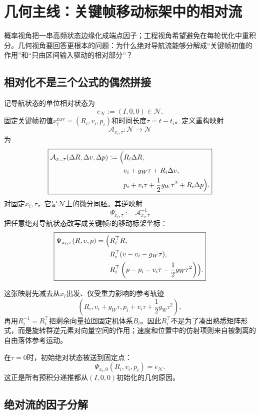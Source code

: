 
\section{几何主线：关键帧移动标架中的相对流}

概率视角把一串高频状态边缘化成端点因子；工程视角希望避免在每轮优化中重积分。几何视角要回答更根本的问题：为什么绝对导航流能够分解成“关键帧初值的作用”和“只由区间输入驱动的相对部分”？

\subsection{相对化不是三个公式的偶然拼接}

记导航状态的单位相对状态为
\[
    e_{\mathcal N}:=(I,0,0)\in\mathcal N.
\]
固定关键帧初值$x_i^{\mathrm{nav}}=(R_i,v_i,p_i)$和时间长度$\tau=t-t_i$。定义重构映射
\[
    \mathcal A_{x_i,\tau}:\mathcal N\to\mathcal N
\]
为
\[
\boxed{
\begin{aligned}
    \mathcal A_{x_i,\tau}(\Delta R,\Delta v,\Delta p)
    :=\Bigl(&R_i\Delta R,\\
             &v_i+g_W\tau+R_i\Delta v,\\
             &p_i+v_i\tau+\frac12g_W\tau^2+R_i\Delta p
       \Bigr).
\end{aligned}
}
\]
对固定$x_i,\tau$，它是$\mathcal N$上的微分同胚。其逆映射
\[
    \Psi_{x_i,\tau}:=\mathcal A_{x_i,\tau}^{-1}
\]
把任意绝对导航状态改写成关键帧$i$的移动标架坐标：
\[
\boxed{
\begin{aligned}
    \Psi_{x_i,\tau}(R,v,p)
    =\Bigl(&R_i^\top R,\\
            &R_i^\top(v-v_i-g_W\tau),\\
            &R_i^\top\left(
               p-p_i-v_i\tau-\frac12g_W\tau^2
             \right)
      \Bigr).
\end{aligned}
}
\]

这张映射先减去从$x_i$出发、仅受重力影响的参考轨迹
\[
    \left(
      R_i,
      v_i+g_W\tau,
      p_i+v_i\tau+\frac12g_W\tau^2
    \right),
\]
再用$R_i^{-1}=R_i^\top$把剩余向量拉回固定机体系$B_i$。因此$R_i^\top$不是为了凑出熟悉矩阵形式，而是旋转群逆元素对向量空间的作用；速度和位置中的仿射项则来自被剥离的自由落体参考运动。

在$\tau=0$时，初始绝对状态被送到固定点：
\[
    \Psi_{x_i,0}(R_i,v_i,p_i)=e_{\mathcal N}.
\]
这正是所有预积分递推都从$(I,0,0)$初始化的几何原因。

\subsection{绝对流的因子分解}


